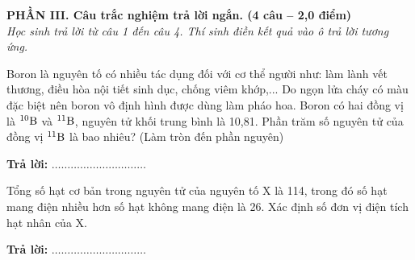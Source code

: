 \documentclass[11pt,a4paper]{article}
\begin{document}
\vspace{4pt}
\noindent
{\color{mainGreen}\textbf{\large PHẦN III. Câu trắc nghiệm trả lời ngắn. (4 câu -- 2,0 điểm)}}\\
\textit{\small Học sinh trả lời từ câu 1 đến câu 4. Thí sinh điền kết quả vào ô trả lời tương ứng.}
\vspace{2pt}

\begin{ex}
Boron là nguyên tố có nhiều tác dụng đối với cơ thể người như: làm lành vết thương, điều hòa nội tiết sinh dục, chống viêm khớp,... Do ngọn lửa cháy có màu đặc biệt nên boron vô định hình được dùng làm pháo hoa. Boron có hai đồng vị là $^{10}\ce{B}$ và $^{11}\ce{B}$, nguyên tử khối trung bình là 10,81. Phần trăm số nguyên tử của đồng vị $^{11}\ce{B}$ là bao nhiêu? (Làm tròn đến phần nguyên)

\vspace{2pt}
\textbf{Trả lời:} $\dots\dots\dots\dots\dots\dots\dots\dots\dots\dots$
\end{ex}

\begin{ex}
Tổng số hạt cơ bản trong nguyên tử của nguyên tố X là 114, trong đó số hạt mang điện nhiều hơn số hạt không mang điện là 26. Xác định số đơn vị điện tích hạt nhân của X.

\vspace{2pt}
\textbf{Trả lời:} $\dots\dots\dots\dots\dots\dots\dots\dots\dots\dots$
\end{ex}
\end{document}
